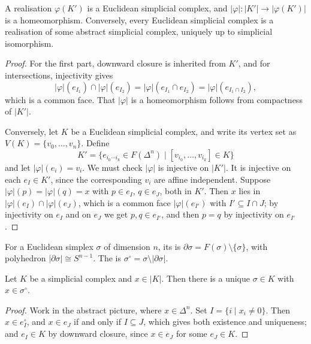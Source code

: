 \begin{proposition} \label{prop:realisation}
	A realisation $\varphi(K')$ is a Euclidean simplicial complex, and $|\varphi|: |K'| \to |\varphi(K')|$ is a homeomorphism. Conversely, every Euclidean simplicial complex is a realisation of some abstract simplicial complex, uniquely up to simplicial isomorphism.
\end{proposition}
\begin{proof}
	For the first part, downward closure is inherited from $K'$, and for intersections, injectivity gives
	$$
	|\varphi|(e_{I_1}) \cap |\varphi|(e_{I_2}) = |\varphi|(e_{I_1}\cap e_{I_2}) = |\varphi|(e_{I_1\cap I_2}),
	$$
	which is a common face. That $|\varphi|$ is a homeomorphism follows from compactness of $|K'|$.

	Conversely, let $K$ be a Euclidean simplicial complex, and write its vertex set as $V(K) = \{v_0,\dots,v_n\}$. Define
	$$
	K' = \{e_{i_0\cdots i_k} \in F(\Delta^n) \mid [v_{i_0},\dots,v_{i_k}] \in K\}
	$$
	and let $|\varphi|(e_i) = v_i$. We must check $|\varphi|$ is injective on $|K'|$. It is injective on each $e_I \in K'$, since the corresponding $v_i$ are affine independent. Suppose $|\varphi|(p) = |\varphi|(q) = x$ with $p \in e_I$, $q \in e_J$, both in $K'$. Then $x$ lies in $|\varphi|(e_I)\cap|\varphi|(e_J)$, which is a common face $|\varphi|(e_{I'})$ with $I' \subseteq I \cap J$; by injectivity on $e_I$ and on $e_J$ we get $p, q \in e_{I'}$, and then $p = q$ by injectivity on $e_{I'}$.
\end{proof}

\begin{definition}
	For a Euclidean simplex $\sigma$ of dimension $n$, its  is $\partial\sigma = F(\sigma)\setminus\{\sigma\}$, with polyhedron $|\partial\sigma| \cong S^{n-1}$. The  is $\sigma^\circ = \sigma \setminus |\partial\sigma|$.
\end{definition}

\begin{lemma} \label{lem:unique-open-simplex}
	Let $K$ be a simplicial complex and $x \in |K|$. Then there is a unique $\sigma \in K$ with $x \in \sigma^\circ$.
\end{lemma}
\begin{proof}
	Work in the abstract picture, where $x \in \Delta^n$. Set $I = \{i \mid x_i \neq 0\}$. Then $x \in e_I^\circ$, and $x \in e_J$ if and only if $I \subseteq J$, which gives both existence and uniqueness; and $e_I \in K$ by downward closure, since $x \in e_J$ for some $e_J \in K$.
\end{proof}

